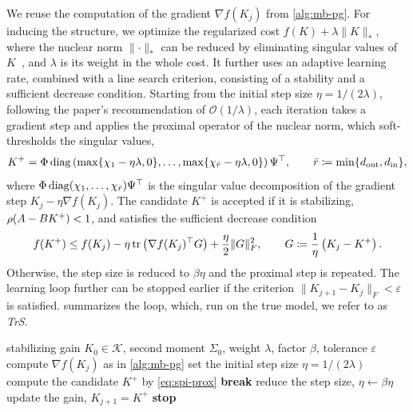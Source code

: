 We reuse the computation of the gradient $\nabla f(K_j)$ from \cref{alg:mb-pg}.
For inducing the structure, we optimize the regularized cost $f(K) + \lambda \lVert K \rVert_{*}$,
where the nuclear norm $\lVert \cdot \rVert_{*}$ can be reduced by eliminating singular values of $K$~\cite[Sec.~2.2]{Park2020Structured},
and $\lambda$ is its weight in the whole cost. It further uses an adaptive learning rate,
combined with a line search criterion, consisting of a stability and a sufficient decrease condition.
Starting from the initial step size $\eta = 1 / (2 \lambda)$, following the paper's recommendation of $\mathcal{O}(1/\lambda)$,
each iteration takes a gradient step and applies the
proximal operator of the nuclear norm, which soft-thresholds the singular values,
\begin{equation}
    \label{eq:spi-prox}
    K^{+} = \Phi \operatorname{diag} \left( \max\{\chi_1 - \eta \lambda, 0\}, \dots,
    \max\{\chi_{\bar{r}} - \eta \lambda, 0\} \right) \Psi^{\top} ,
    \qquad \bar{r} \coloneqq \min\{d_{\mathrm{out}}, d_{\mathrm{in}}\} ,
\end{equation}
where $\Phi \operatorname{diag}(\chi_1, \dots, \chi_{\bar{r}}) \Psi^{\top}$ is the singular value decomposition of
the gradient step $K_j - \eta \nabla f(K_j)$. The candidate $K^{+}$ is accepted if it is stabilizing, $\operatorname{\rho}(A - B K^{+}) < 1$, and
satisfies the sufficient decrease condition
\begin{equation}
    \label{eq:spi-sufficient-decrease}
    f(K^{+}) \leq f(K_j) - \eta \operatorname{tr} \left( \nabla f(K_j)^{\top} G \right) + \frac{\eta}{2} \lVert G \rVert_F^2 ,
    \qquad G \coloneqq \frac{1}{\eta} \left( K_j - K^{+} \right) .
\end{equation}
Otherwise, the step size is reduced to $\beta \eta$ and the proximal step is repeated. The learning loop further can be
stopped earlier if the criterion $\lVert K_{j+1} - K_j \rVert_F < \varepsilon$ is satisfied.
 summarizes the loop, which, run on the true model, we refer to as \emph{TrS}.
\begin{algorithm}[htbp]
    \caption{S-PI}
    \label{alg:mb-spi}
    \begin{algorithmic}[1]
        \REQUIRE stabilizing gain $K_0 \in \mathcal{K}$, second moment $\Sigma_0$, weight $\lambda$, factor $\beta$,
        tolerance $\varepsilon$
            \STATE compute $\nabla f(K_j)$ as in \cref{alg:mb-pg}
            \STATE set the initial step size $\eta = 1 / (2 \lambda)$
                \STATE compute the candidate $K^{+}$ by \eqref{eq:spi-prox}
                    \STATE \textbf{break}
                \ENDIF
                \STATE reduce the step size, $\eta \leftarrow \beta \eta$
            \ENDFOR
            \STATE update the gain, $K_{j+1} = K^{+}$
                \STATE \textbf{stop}
            \ENDIF
        \ENDFOR
    \end{algorithmic}
\end{algorithm}

